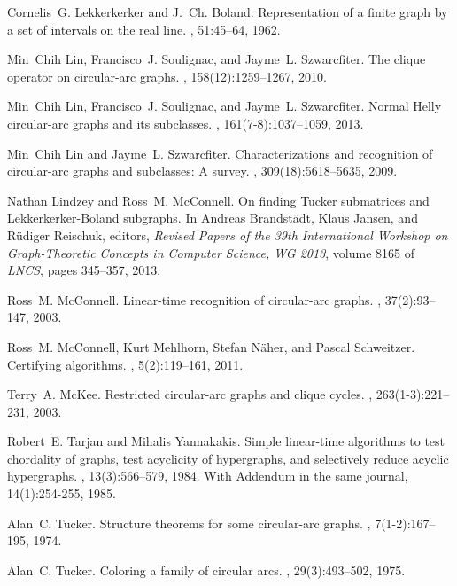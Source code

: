 \documentclass[10pt]{article}
\begin{document}
\begin{thebibliography}{10}
Cornelis~G. Lekkerkerker and J.~Ch. Boland.
\newblock Representation of a finite graph by a set of intervals on the real
  line.
, 51:45--64, 1962.

Min~Chih Lin, Francisco~J. Soulignac, and Jayme~L. Szwarcfiter.
\newblock The clique operator on circular-arc graphs.
, 158(12):1259--1267, 2010.

Min~Chih Lin, Francisco~J. Soulignac, and Jayme~L. Szwarcfiter.
\newblock Normal {H}elly circular-arc graphs and its subclasses.
, 161(7-8):1037--1059, 2013.

Min~Chih Lin and Jayme~L. Szwarcfiter.
\newblock Characterizations and recognition of circular-arc graphs and
  subclasses: A survey.
, 309(18):5618--5635, 2009.

Nathan Lindzey and Ross~M. McConnell.
\newblock On finding {Tucker} submatrices and {Lekkerkerker-Boland} subgraphs.
\newblock In Andreas Brandst\"{a}dt, Klaus Jansen, and R{\"u}diger Reischuk,
  editors, {\em Revised Papers of the 39th International Workshop on
  Graph-Theoretic Concepts in Computer Science, WG 2013}, volume 8165 of {\em
  LNCS}, pages 345--357, 2013.

Ross~M. McConnell.
\newblock Linear-time recognition of circular-arc graphs.
, 37(2):93--147, 2003.

Ross~M. McConnell, Kurt Mehlhorn, Stefan N{\"a}her, and Pascal Schweitzer.
\newblock Certifying algorithms.
, 5(2):119--161, 2011.

Terry~A. McKee.
\newblock Restricted circular-arc graphs and clique cycles.
, 263(1-3):221--231, 2003.

Robert~E. Tarjan and Mihalis Yannakakis.
\newblock Simple linear-time algorithms to test chordality of graphs, test
  acyclicity of hypergraphs, and selectively reduce acyclic hypergraphs.
, 13(3):566--579, 1984.
\newblock With Addendum in the same journal, 14(1):254-255, 1985.

Alan~C. Tucker.
\newblock Structure theorems for some circular-arc graphs.
, 7(1-2):167--195, 1974.

Alan~C. Tucker.
\newblock Coloring a family of circular arcs.
, 29(3):493--502, 1975.

\end{thebibliography}
\end{document}
